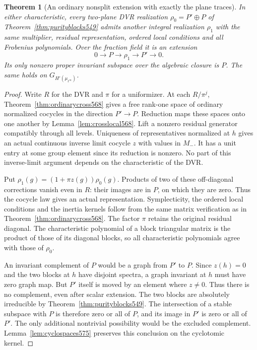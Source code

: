 \documentclass[a4paper,11pt]{article}
\newtheorem{theorem}[proposition]{Theorem}
\theoremstyle{definition}
\theoremstyle{remark}
\numberwithin{equation}{section}
\begin{document}
\begin{theorem}[An ordinary nonsplit extension with exactly the plane traces]
\leavevmode\label{thm:blockwitness575}
In either characteristic, every two-plane DVR realization
\(\rho_0=P'\oplus P\) of Theorem~\ref{thm:purityblocks549}
admits another integral realization \(\rho_1\) with the
same multiplier, residual representation, ordered local
conditions and all Frobenius polynomials. Over the
fraction field it is an extension
\[
                     0\longrightarrow P\longrightarrow
                      \rho_1\longrightarrow P'\longrightarrow0 .
\]
Its only nonzero proper invariant subspace over the algebraic
closure is \(P\). The same holds on \(G_{H'(\mu_{\ell^\infty})}\).
\end{theorem}
\begin{proof}
Write \(R\) for the DVR and \(\pi\) for a uniformizer.
At each \(R/\pi^j\), Theorem~\ref{thm:ordinarycross568}
gives a free rank-one space of ordinary normalized
cocycles in the direction \(P'\to P\). Reduction maps
these spaces onto one another by Lemma~\ref{lem:crosslocal568}.
Lift a nonzero residual generator compatibly through all
levels. Uniqueness of representatives normalized at \(h\)
gives an actual continuous inverse limit cocycle \(z\)
with values in \(M_-\). It has a unit entry at some group
element since its reduction is nonzero. No part of this
inverse-limit argument depends on the characteristic
of the DVR.

Put \(\rho_1(g)=(1+\pi z(g))\rho_0(g)\). Products of two
of these off-diagonal corrections vanish even in \(R\):
their images are in \(P\), on which they are zero. Thus
the cocycle law gives an actual representation. Symplecticity,
the ordered local conditions and the inertia kernels follow
from the same matrix verification as in
Theorem~\ref{thm:ordinarycross568}. The factor \(\pi\)
retains the original residual diagonal. The characteristic
polynomial of a block triangular matrix is the product of
those of its diagonal blocks, so all characteristic
polynomials agree with those of \(\rho_0\).

An invariant complement of \(P\) would be a graph from
\(P'\) to \(P\). Since \(z(h)=0\) and the two blocks at
\(h\) have disjoint spectra, a graph invariant at \(h\)
must have zero graph map. But \(P'\) itself is moved
by an element where \(z\ne0\). Thus there is no
complement, even after scalar extension. The two blocks
are absolutely irreducible by
Theorem~\ref{thm:purityblocks549}. The intersection of a
stable subspace with \(P\) is therefore zero or all of
\(P\), and its image in \(P'\) is zero or all of \(P'\).
The only additional nontrivial possibility would be the
excluded complement. Lemma~\ref{lem:cyclospaces575}
preserves this conclusion on the cyclotomic kernel.
\end{proof}
\end{document}
